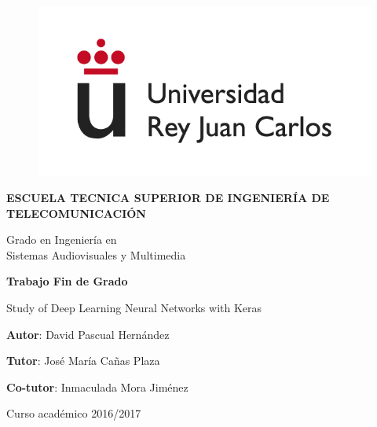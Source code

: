 \begin{titlepage}
	
	\begin{center}
		
		\begin{figure}[htb]
			\begin{center}
				\includegraphics[width=0.6\linewidth]{figures/logo}
			\end{center}
		\end{figure}
		
		\vspace{10mm}
		
		\begin{Large}
			\textbf{ESCUELA TECNICA SUPERIOR DE INGENIERÍA DE TELECOMUNICACIÓN}
			\vspace{10mm}
		\end{Large}
		
		\begin{Large}
			Grado en Ingeniería en\\ \vspace{2mm} Sistemas Audiovisuales y Multimedia
		\end{Large}
		
		\vspace{10mm}
		
		\begin{large}
			\textbf{Trabajo Fin de Grado}
		\end{large}
		\vspace{25mm}
		
		\begin{huge}
			Study of Deep Learning Neural Networks with Keras
		\end{huge}
		
		\vspace{25mm}
		
		\begin{large}
			\textbf{Autor}: David Pascual Hernández
			
			\textbf{Tutor}: José María Cañas Plaza
			
			\textbf{Co-tutor}: Inmaculada Mora Jiménez 
			
			\vspace{10mm}
			
			Curso académico 2016/2017
		\end{large}
		
		\vspace{10mm}
		
	\end{center}
	
\end{titlepage}

